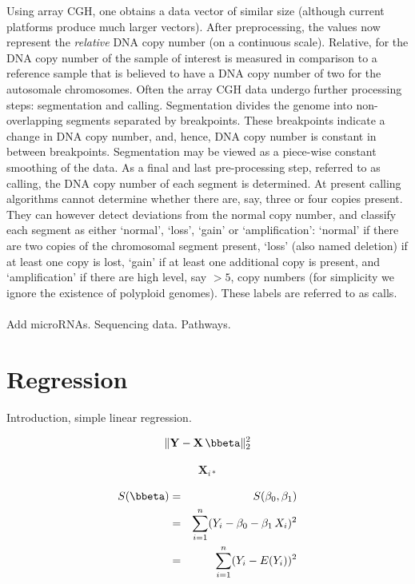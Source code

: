 \documentclass[a4paper]{article}
\theoremstyle{myexamplestyle}
\begin{document}
Using array CGH, one obtains a data vector of similar size (although current platforms produce much larger vectors). After preprocessing, the values now represent the {\it relative} DNA copy number (on a continuous scale). Relative, for the DNA copy number of the sample of interest is measured in comparison to a reference sample that is believed to have a DNA copy number of two for the autosomale chromosomes. Often the array CGH data undergo further processing steps: segmentation and calling. Segmentation divides the genome into non-overlapping segments separated by breakpoints. These breakpoints indicate a change in DNA copy number, and, hence, DNA copy number is constant in between breakpoints. Segmentation may be viewed as a piece-wise constant smoothing of the data. As a final and last pre-processing step, referred to as calling, the DNA copy number of each segment is determined. At present calling algorithms cannot determine whether there are, say, three or four copies present. They can however detect deviations from the normal copy number, and classify each segment as either `normal', `loss', `gain'  or `amplification': `normal' if there are two copies of the chromosomal segment present, `loss' (also named deletion) if at least one copy is lost, `gain' if at least one additional copy is present, and `amplification' if there are high level, say $> 5$, copy numbers (for simplicity we ignore the existence of polyploid genomes). These labels are referred to as calls.
\\
\\
Add microRNAs. Sequencing data. Pathways.



\newpage
\section{Regression}
Introduction, simple linear regression. 

\begin{eqnarray*}
\| \mathbf{Y} - \mathbf{X} \, \bbeta \|^2_2
\end{eqnarray*}



\begin{eqnarray*}
\mathbf{X}_{i\ast}
\end{eqnarray*}


\begin{eqnarray*}
S(\bbeta) & = & S(\beta_0, \beta_1)
\\
& = & \sum_{i=1}^n (Y_i - \beta_0 - \beta_1 \, X_{i})^2
\\
& = & \sum_{i=1}^n (Y_i - E(Y_i))^2
\end{eqnarray*}
\end{document}
